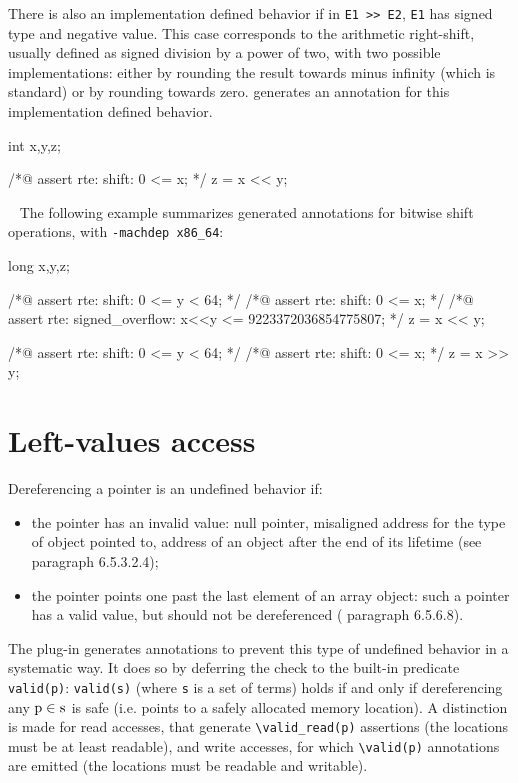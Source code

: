 There is also an implementation defined behavior if in \lstinline|E1 >> E2|,
\lstinline|E1| has signed type and negative value.  This case corresponds to the
arithmetic right-shift, usually defined as signed division by a power of two,
with two possible implementations: either by rounding the result towards minus
infinity (which is standard) or by rounding towards zero. \rte{} generates an
annotation for this implementation defined behavior.

\begin{listing-nonumber}
int x,y,z;

/*@ assert rte: shift: 0 <= x; */
z = x << y;
\end{listing-nonumber}

\begin{example} ~
The following example summarizes \rte{} generated annotations for bitwise shift
operations, with \lstinline|-machdep x86_64|:

\begin{listing-nonumber}
long x,y,z;

/*@ assert rte: shift: 0 <= y < 64; */
/*@ assert rte: shift: 0 <= x; */
/*@ assert rte: signed_overflow: x<<y <= 9223372036854775807; */
z = x << y;

/*@ assert rte: shift: 0 <= y < 64; */
/*@ assert rte: shift: 0 <= x; */
z = x >> y;
\end{listing-nonumber}

\end{example}

\section{Left-values access}

Dereferencing a pointer is an undefined behavior if:
\begin{itemize}

\item the pointer has an invalid value: null pointer, misaligned address for the
  type of object pointed to, address of an object after the end of its lifetime
  (see \cnn{} paragraph \mbox{6.5.3.2.4});

\item the pointer points one past the last element of an array object: such a
  pointer has a valid value, but should not be dereferenced (\cnn{} paragraph
  \mbox{6.5.6.8}).
\end{itemize}

The \rte{} plug-in generates annotations to prevent this type of undefined
behavior in a systematic way. It does so by deferring the check to the \acsl{}
built-in predicate \lstinline|valid(p)|: \lstinline|valid(s)| (where
\lstinline|s| is a set of terms) holds if and only if dereferencing any
$\lstinline|p| \in \lstinline|s|$ is safe (i.e. points to a safely allocated
memory location).  A distinction is made for read accesses, that generate
\lstinline|\valid_read(p)| assertions (the locations must be at least readable),
and write accesses, for which \lstinline|\valid(p)| annotations are emitted (the
locations must be readable and writable).

